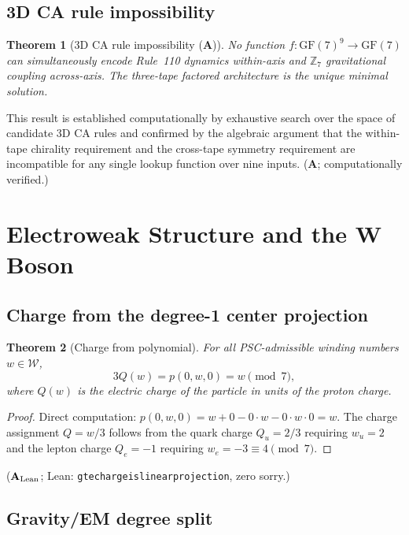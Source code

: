 \documentclass[11pt]{article}
\newtheorem{theorem}{Theorem}[section]
\theoremstyle{remark}
\newcommand{\ZS}{\mathbb{Z}_7}
\newcommand{\lean}[1]{%
  \penalty-100
  \begingroup\def\_{\textunderscore\allowbreak}\texttt{#1}\endgroup}
\newcommand{\GFseven}{\mathrm{GF}(7)}
\newcommand{\CatA}{\textbf{A}}
\newcommand{\CatAL}{\ensuremath{\textbf{A}_{\rm Lean}}}
\begin{document}
\subsection{3D CA rule impossibility}
\label{ssec:3d_impossible}

\begin{theorem}[3D CA rule impossibility ($\CatA$)]
No function $f:\GFseven^9\to\GFseven$ can simultaneously encode Rule~110
dynamics within-axis and $\ZS$ gravitational coupling across-axis.
The three-tape factored architecture is the unique minimal solution.
\end{theorem}

This result is established computationally by exhaustive search over the space
of candidate 3D CA rules and confirmed by the algebraic argument that the
within-tape chirality requirement and the cross-tape symmetry requirement are
incompatible for any single lookup function over nine inputs.
($\CatA$; computationally verified.)

\section{Electroweak Structure and the W Boson}
\label{sec:ew}

\subsection{Charge from the degree-1 center projection}
\label{ssec:charge}

\begin{theorem}[Charge from polynomial]
\label{thm:charge}
For all PSC-admissible winding numbers $w\in\mathcal{W}$,
\[
  3Q(w) = p(0,w,0) = w \pmod 7,
\]
where $Q(w)$ is the electric charge of the particle in units of the proton charge.
\end{theorem}

\begin{proof}
Direct computation: $p(0,w,0) = w + 0 - 0\cdot w - 0\cdot w\cdot 0 = w$.
The charge assignment $Q = w/3$ follows from the quark charge $Q_u = 2/3$
requiring $w_u = 2$ and the lepton charge $Q_e = -1$ requiring $w_e = -3 \equiv 4\pmod 7$.
\end{proof}

($\CatAL$; Lean: \lean{gte\_charge\_is\_linear\_projection}, zero sorry.)

\subsection{Gravity/EM degree split}
\label{ssec:degree_split}
\end{document}
